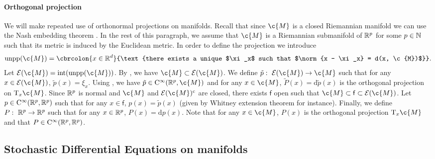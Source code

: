 \paragraph{Orthogonal projection}
We will make repeated use of orthonormal projections on manifolds.
Recall that since $\c{M}$ is a closed Riemannian manifold we can use the Nash embedding theorem \parencite{gunther1991isometric}.
In the rest of this paragraph, we assume that $\c{M}$ is a Riemannian submanifold of $\mathbb{R}^p$ for some $p \in \mathbb{N}$ such that its metric is induced by the Euclidean metric.
In order to define the projection we introduce \begin{equation} \mathrm{unpp}(\c{M}) = \cbrcolon{x \in \R^d}{\text{there exists a unique $\xi_x$ such that $\norm{x - \xi_x} = d(x, \c{M})$}} .
\end{equation}
Let $\mathcal{E}(\c{M}) = \mathrm{int}(\mathrm{unpp}(\c{M}))$.
By \textcite[Theorem 1]{leobacher2021existence}, we have $\c{M} \subset \mathcal{E}(\c{M})$.
We define $\tilde{p}: \ \mathcal{E}(\c{M}) \to \c{M}$ such that for any $x \in \mathcal{E}(\c{M})$, $\tilde{p}(x) = \xi_x$.
Using \textcite[Theorem 2]{leobacher2021existence}, we have $\tilde{p} \in \mathrm{C}^\infty(\R^p, \c{M})$ and for any $x \in \c{M}$, $\tilde{P}(x) = \mathrm{d} \tilde{p}(x)$ is the orthogonal projection on $\mathrm{T}_x\c{M}$.
Since $\mathbb{R}^p$ is normal and $\c{M}$ and $\mathcal{E}(\c{M})^\mathrm{c}$ are closed, there exists $\mathsf{f}$ open such that $\c{M} \subset \mathsf{f} \subset \mathcal{E}(\c{M})$.
Let $p \in \mathrm{C}^\infty(\mathbb{R}^p, \mathbb{R}^p)$ such that for any $x \in \mathsf{f}$, $p(x) = \tilde{p}(x)$ (given by Whitney extension theorem for instance).
Finally, we define $P: \ \mathbb{R}^p \to \mathbb{R}^p$ such that for any $x \in \mathbb{R}^p$, $P(x) = \mathrm{d} p(x)$.
Note that for any $x \in \c{M}$, $P(x)$ is the orthogonal projection $\mathrm{T}_x \c{M}$ and that $P \in \mathrm{C}^\infty(\mathbb{R}^p, \mathbb{R}^p)$.

\subsection{Stochastic Differential Equations on manifolds}
\label{sec:stoch-diff-equat}

